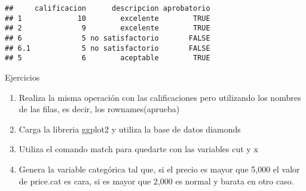 \documentclass[]{article}
\newenvironment{Shaded}{\begin{snugshade}}{\end{snugshade}}
\newcommand{\KeywordTok}[1]{\textcolor[rgb]{0.13,0.29,0.53}{\textbf{#1}}}
\newcommand{\DataTypeTok}[1]{\textcolor[rgb]{0.13,0.29,0.53}{#1}}
\newcommand{\DecValTok}[1]{\textcolor[rgb]{0.00,0.00,0.81}{#1}}
\newcommand{\StringTok}[1]{\textcolor[rgb]{0.31,0.60,0.02}{#1}}
\newcommand{\OperatorTok}[1]{\textcolor[rgb]{0.81,0.36,0.00}{\textbf{#1}}}
\newcommand{\NormalTok}[1]{#1}
\begin{document}
\begin{Shaded}
\end{Shaded}

\begin{verbatim}
##     calificacion      descripcion aprobatorio
## 1             10        excelente        TRUE
## 2              9        excelente        TRUE
## 6              5 no satisfactorio       FALSE
## 6.1            5 no satisfactorio       FALSE
## 5              6        aceptable        TRUE
\end{verbatim}

\renewcommand\bcStyleTitre[1]{\large\textcolor{bbblack}{#1}}

\begin{bclogo}[
  couleur=llred,
  arrondi=0,
  logo=\bcstop,
  barre=none,
  noborder=true]{Ejercicios}
\begin{enumerate}
\item Realiza la misma operación con las calificaciones pero utilizando los 
nombres de las filas, es decir, los rownames(aprueba)
\item Carga la libreria ggplot2 y utiliza la base de datos diamonds
\item Utiliza el comando match para quedarte con las variables cut y x 
\item Genera la variable categórica tal que, si el precio es mayor que 5,000 el 
valor de price.cat es cara, si es mayor que 2,000 es normal y barata en otro caso.
\end{enumerate}
\end{bclogo}
\end{document}
